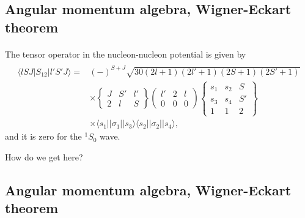 \documentclass[%
twoside,                 %
final,                   %
10pt]{article}
\begin{document}
\subsection{Angular momentum algebra, Wigner-Eckart theorem}

\paragraph{}
The tensor operator in the nucleon-nucleon potential
is given by
\[
\begin{array}{ll}
&\\
\langle lSJ\vert S_{12}\vert l'S'J\rangle =&
(-)^{S+J}\sqrt{30(2l+1)(2l'+1)(2S+1)(2S'+1)}\\
&\times\left\{\begin{array}{ccc}J&S'&l'\\2&l&S\end{array}\right\}
\left(\begin{array}{ccc}l'&2&l\\0&0&0\end{array}\right)
\left\{\begin{array}{ccc}s_{1}&s_{2}&S\\s_{3}&s_{4}&S'\\
1&1&2\end{array}
\right\}\\
&\times\langle s_{1}\vert\vert \sigma_{1}\vert\vert s_{3}\rangle
\langle s_{2}\vert\vert \sigma_{2}\vert \vert s_{4}\rangle,
\end{array}
\]
and it is zero for the $^1S_0$ wave. 

How do we get here?


\subsection{Angular momentum algebra, Wigner-Eckart theorem}

\end{document}
